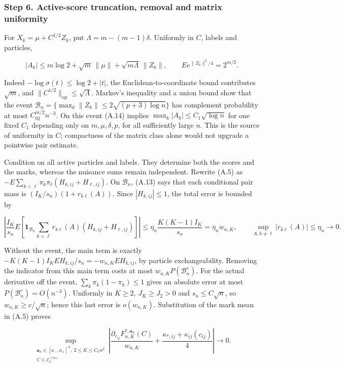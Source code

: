\documentclass{article}
\begin{document}
\subsubsection*{Step 6. Active-score truncation, removal and matrix
uniformity}\label{step-6.-active-score-truncation-removal-and-matrix-uniformity}

For \(X_k=\mu+C^{1/2}Z_k\), put \(\Lambda=m-(m-1)\delta\). Uniformly in
\(C\), labels and particles,

\[
|A_k|\le m\log2+\sqrt m\,\|\mu\|+\sqrt{m\Lambda}\,\|Z_k\|,
\qquad E e^{\|Z_k\|^2/4}=2^{m/2}.
\tag{A.14}
\]

Indeed \(-\log\sigma(t)\le\log2+|t|\), the Euclidean-to-coordinate bound
contributes \(\sqrt m\), and
\(\|C^{1/2}\|_{\mathrm{op}}\le\sqrt\Lambda\). Markov's inequality and a
union bound show that the event
\(\mathcal B_n=\{\max_k\|Z_k\|\le2\sqrt{(p+3)\log n}\}\) has complement
probability at most \(C_02^{m/2}n^{-3}\). On this event (A.14) implies
\(\max_k|A_k|\le C_1\sqrt{\log n}\) for one fixed \(C_1\) depending only
on \(m,\mu,\delta,p\), for all sufficiently large \(n\). This is the
source of uniformity in \(C\); compactness of the matrix class alone
would not upgrade a pointwise pair estimate.

Condition on all active particles and labels. They determine both the
scores and the marks, whereas the nuisance sums remain independent.
Rewrite (A.5) as \(-E\sum_{k<\ell}\pi_k\pi_\ell(H_{k,ij}+H_{\ell,ij})\).
On \(\mathcal B_n\), (A.13) says that each conditional pair mass is
\((I_K/s_n)(1+r_{k\ell}(A))\). Since \(|H_{k,ij}|\le1\), the total error
is bounded by

\[
\left|\frac{I_K}{s_n}E\!\left[
\mathbf1_{\mathcal B_n}\sum_{k<\ell}
 r_{k\ell}(A)(H_{k,ij}+H_{\ell,ij})\right]\right|
\le \eta_n\frac{K(K-1)I_K}{s_n}=\eta_n w_{n,K},\qquad
\sup_{A,k\ne\ell}|r_{k\ell}(A)|\le\eta_n\longrightarrow0.
\]

Without the event, the main term is exactly
\(-K(K-1)I_KEH_{k,ij}/s_n=-w_{n,K}EH_{k,ij}\), by particle
exchangeability. Removing the indicator from this main term costs at
most \(w_{n,K}P(\mathcal B_n^c)\). For the actual derivative off the
event, \(\sum_k\pi_k(1-\pi_k)\le1\) gives an absolute error at most
\(P(\mathcal B_n^c)=O(n^{-3})\). Uniformly in \(K\ge2\),
\(J_K\ge J_2>0\) and \(s_n\le C\sqrt n\), so \(w_{n,K}\ge c/\sqrt n\);
hence this last error is \(o(w_{n,K})\). Substitution of the mark mean
in (A.5) proves

\[
\sup_{\substack{\mathbf a_n\in[a_-,a_+]^n,\ 2\le K\le C_0n^p\\
C\in\mathcal E_\delta^{(m)}}}
\left|\frac{\partial_{c_{ij}}F_{n,K}^{*,\mathbf a_n}(C)}{w_{n,K}}
+\frac{\kappa_{*,ij}+\kappa_{ij}(c_{ij})}{4}\right|\to0 .
\tag{A.15}
\]
\end{document}
